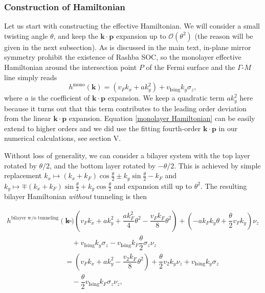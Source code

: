 \begin{subappendices}
		\subsubsection{Construction of Hamiltonian}
			Let us start with constructing the effective Hamiltonian. We will consider a small twisting angle $\theta$, and keep the $\bm{k\cdot p}$ expansion up to $\mathcal{O}(\theta^2)$ (the reason will be given in the next subsection). As is discussed in the main text, in-plane mirror symmetry prohibit the existence of Rashba SOC, so the monolayer effective Hamiltonian around the intersection point $P$ of the Fermi surface and the $\Gamma$-$M$ line simply reads
			\begin{equation}\label{monolayer Hamiltonian}
				h^{\text{mono}}(\bm{k})=(v_F k_x + a k_y^2)+v_{\text{Ising}} k_y \sigma_z,
			\end{equation}
			where $a$ is the coefficient of $\bm{k\cdot p}$ expansion. We keep a quadratic term $ak_y^2$ here because it turns out that this term contributes to the leading order deviation from the linear $\bm{k\cdot p}$ expansion. Equation \eqref{monolayer Hamiltonian} can be easily extend to higher orders and we did use the fitting fourth-order $\bm{k\cdot p}$ in our numerical calculations, see section V.\par
			Without loss of generality, we can consider a bilayer system with the top layer rotated by $\theta/2$, and the bottom layer rotated by $-\theta/2$. This is achieved by simple replacement $k_x\mapsto(k_x+k_F)\cos\frac{\theta}{2}\pm k_y\sin\frac{\theta}{2}-k_F$ and $k_y\mapsto\mp(k_x+k_F)\sin\frac{\theta}{2}+k_y\cos\frac{\theta}{2}$ and expansion still up to $\theta^2$. The resulting bilayer Hamiltonian \emph{without} tunneling is then
			
            \begin{align}\label{bilayer Hamiltonian without Tunneling}
                h^{\text{bilayer w/o tunneling}}(\bm{k})&=\left(v_F k_x+ak_y^2+\dfrac{ak_F^2}{4}\theta^2-\dfrac{v_F k_F}{8}\theta^2\right)+\left(-ak_F k_y \theta+\dfrac{\theta}{2}v_F k_y\right)\nu_z\nonumber\\
                &\quad+v_{\text{Ising}} k_y\sigma_z-v_{\text{Ising}} k_F\dfrac{\theta}{2}\sigma_z\nu_z \nonumber\\
                &=\left(v_F k_x+ak_y^2-\dfrac{v_2 k_F}{8}\theta^2\right)+\dfrac{\theta}{2}v_2k_y\nu_z+v_{\text{Ising}} k_y\sigma_z\nonumber\\
                &\quad-\dfrac{\theta}{2}v_{\text{Ising}} k_F\sigma_z\nu_z,
            \end{align}
			

\end{subappendices}
